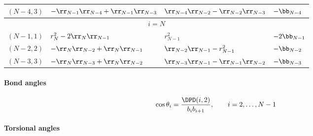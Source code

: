 \begin{table}[ht]
\begin{tabular}{|p{2cm}|p{4cm}|p{4cm}|p{2.5cm}|}
    \hline
    $(N-4,3)$		& $-\rr_{N-1}\rr_{N-4}+\rr_{N-1}\rr_{N-3}$ 
    			& $\rr_{N-4}\rr_{N-2}-\rr_{N-2}\rr_{N-3}$
			& $-\bb_{N-4}$	\\
\hline
\multicolumn{4}{|c|}{$i=N$} \\ 
\hline
$(N-1,1)$ 	& $r_{N}^2-2\rr_{N}\rr_{N-1}$	
    		& $r_{N-1}^2$ 
		& $-2\bb_{N-1}$\\
\hline
$(N-2,2)$ 	& $-\rr_N\rr_{N-2}+\rr_N\rr_{N-1}$ 
    		& $\rr_{N-2}\rr_{N-1}-r_{N-1}^2$ 
		& $-\bb_{N-2}$\\
\hline
$(N-3,3)$	& $-\rr_N\rr_{N-3}+\rr_N\rr_{N-2}$ 
    		& $\rr_{N-3}\rr_{N-1}-\rr_{N-1}\rr_{N-2}$
		& $-\bb_{N-3}$	\\
\hline
  \end{tabular}
\end{table}

\paragraph{Bond angles}

\begin{equation}
  \cos\theta_i=\frac{\DPD(i,2)}{b_ib_{i+1}},\qquad i=2,\ldots,N-1  
  \label{bln-bangle}
\end{equation}

\paragraph{Torsional angles}

